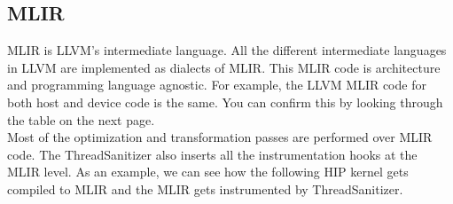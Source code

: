 \documentclass{btp}
\begin{document}
\subsection{MLIR}

MLIR is LLVM's intermediate language. All the different intermediate languages in LLVM are implemented as dialects of MLIR. This MLIR code is architecture and programming language agnostic. For example, the LLVM MLIR code for both host and device code is the same. You can confirm this by looking through the table on the next page.
\\
\newline
Most of the optimization and transformation passes are performed over MLIR code. The ThreadSanitizer also inserts all the instrumentation hooks at the MLIR level. As an example, we can see how the following HIP kernel gets compiled to MLIR and the MLIR gets instrumented by ThreadSanitizer.
\end{document}
